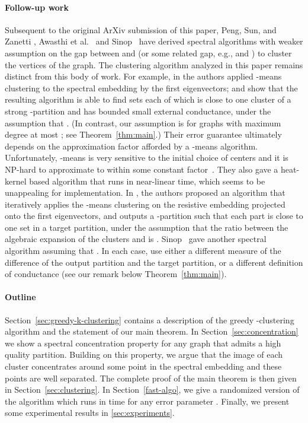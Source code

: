 \documentclass[11pt]{article}
\theoremstyle{plain}
\begin{document}
\paragraph*{Follow-up work} Subsequent to the original ArXiv submission
\cite{DBLP:journals/corr/DeyRS14} of this paper, Peng, Sun, and Zanetti
\cite{DBLP:conf/colt/PengSZ15}, Awasthi et al.~\cite{DBLP:conf/innovations/AwasthiCKS16}
and  Sinop~\cite{DBLP:conf/soda/Sinop16} have derived spectral algorithms with weaker
assumption on the gap between  and  (or some
related gap, e.g.,  and ) to cluster the
vertices of the graph. The clustering algorithm analyzed in this paper remains
distinct from this body of work. For example, in
\cite{DBLP:conf/colt/PengSZ15} the authors applied -means clustering to
the spectral embedding by the first  eigenvectors; and show that the
resulting algorithm is able to find  sets each of which is close to one
cluster of a strong -partition and has bounded small external conductance,
under the assumption that . (In
contrast, our assumption is  for
graphs with maximum degree at most ; see Theorem~\ref{thm:main}.) Their
error guarantee ultimately depends on the approximation factor afforded by a
-means algorithm. Unfortunately, -means is very sensitive to the initial
choice of  centers and it is NP-hard to approximate to within some constant
factor~\cite{DBLP:conf/compgeom/AwasthiCKS15}. They also gave a heat-kernel
based algorithm that runs in near-linear time, which seems to be unappealing for
implementation. In \cite{DBLP:conf/innovations/AwasthiCKS16}, the authors proposed an algorithm
that iteratively applies the -means clustering on the resistive embedding
projected onto the first  eigenvectors, and outputs a -partition such that
each part is close to one set in a target partition, under the assumption that
the ratio between the algebraic expansion of the clusters and 
is .   Sinop~\cite{DBLP:conf/soda/Sinop16} gave another spectral algorithm assuming
that . In each case,
\cite{DBLP:conf/innovations/AwasthiCKS16,DBLP:conf/colt/PengSZ15,DBLP:conf/soda/Sinop16} use either a
different measure of the difference of the output partition and the target
partition, or a different definition of conductance (see our remark below
Theorem~\ref{thm:main}).

\paragraph*{Outline} Section~\ref{sec:greedy-k-clustering} contains a
description of the greedy -clustering algorithm and the statement of our main
theorem. In Section~\ref{sec:concentration} we show a spectral concentration
property for any graph that admits a high quality partition. Building on this
property, we argue that the image of each cluster concentrates around some point
in the spectral embedding and these points are well separated. The complete proof of the main theorem is then given in Section~\ref{sec:clustering}.
In Section~\ref{fast-algo}, we give a randomized version of the algorithm which runs
in time  for any error parameter .
Finally, we present some experimental results in \ref{sec:experiments}.
\end{document}
